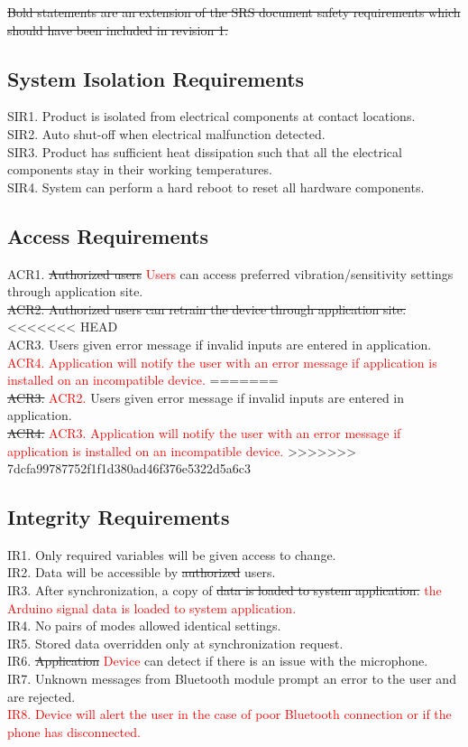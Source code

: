 \documentclass[12pt, titlepage]{article}
\begin{document}
\sout{Bold statements are an extension of the SRS document safety requirements which should have been included in revision 1.}


\subsection{System Isolation Requirements}

SIR1. Product is isolated from electrical components at contact locations.
\\SIR2. Auto shut-off when electrical malfunction detected. 
\\SIR3. Product has sufficient heat dissipation such that all the electrical components stay in their working temperatures.
\\SIR4. System can perform a hard reboot to reset all hardware components.


\subsection{Access Requirements}

ACR1. \sout{Authorized users} \textcolor{red}{Users} can access preferred vibration/sensitivity settings through application site.
\sout{\\ACR2. Authorized users can retrain the device through application site.}
<<<<<<< HEAD
\\ACR3. Users given error message if invalid inputs are entered in application.
\\\textcolor{red}{ACR4. Application will notify the user with an error message if application is installed on an incompatible device.}
=======
\\\sout{ACR3.} \textcolor{red}{ACR2.} Users given error message if invalid inputs are entered in application.
\\\sout{ACR4.} \textcolor{red}{ACR3. Application will notify the user with an error message if application is installed on an incompatible device.}
>>>>>>> 7dcfa99787752f1f1d380ad46f376e5322d5a6c3

\subsection{Integrity Requirements}

IR1. Only required variables will be given access to change.
\\IR2. Data will be accessible by \sout{authorized} users.
\\ IR3. After synchronization, a copy of \sout{data is loaded to system application.} \textcolor{red}{the Arduino signal data is loaded to system application.}
\\IR4. No pairs of modes allowed identical settings.
\\IR5. Stored data overridden only at synchronization request.
\\IR6. \sout{Application} \textcolor{red}{Device} can detect if there is an issue with the microphone.
\\IR7. Unknown messages from Bluetooth module prompt an error to the user and are rejected.
\\\textcolor{red}{IR8. Device will alert the user in the case of poor Bluetooth connection or if the phone has disconnected.}
\end{document}
